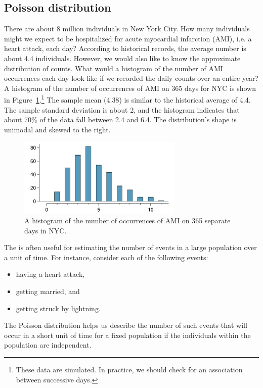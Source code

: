 \textC{\pagebreak}


\subsection{Poisson distribution}
\label{poisson}


\begin{example}{There are about 8 million individuals in New York City. How many individuals might we expect to be hospitalized for acute myocardial infarction (AMI), i.e. a heart attack, each day? According to historical records, the average number is about 4.4 individuals. However, we would also like to know the approximate distribution of counts. What would a histogram of the number of AMI occurrences each day look like if we recorded the daily counts over an entire year?} \label{amiIncidencesEachDayOver1YearInNYCExample}
A histogram of the number of occurrences of AMI on 365 days for NYC is shown in Figure~\ref{amiIncidencesOver100Days}.\footnote{These data are simulated. In practice, we should check for an association between successive days.} The sample mean (4.38) is similar to the historical average of 4.4. The sample standard deviation is about 2, and the histogram indicates that about 70\% of the data fall between 2.4 and 6.4. The distribution's shape is unimodal and skewed to the right.
\end{example}

\begin{figure}[h]
\centering
\includegraphics[width=0.7\textwidth]{ch_distributions/figures/amiIncidencesOver100Days/amiIncidencesOver100Days}
\caption{A histogram of the number of occurrences of AMI on 365 separate days in NYC.}
\label{amiIncidencesOver100Days}
\end{figure}

The  is often useful for estimating the number of events in a large population over a unit of time. For instance, consider each of the following events:
\begin{itemize}
\setlength{\itemsep}{0mm}
\item having a heart attack,
\item getting married, and
\item getting struck by lightning.
\end{itemize}
The Poisson distribution helps us describe the number of such events that will occur in a short unit of time for a fixed population if the individuals within the population are independent.


